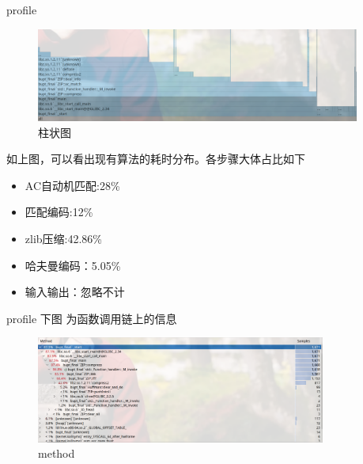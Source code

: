 \documentclass[10pt]{ctexbeamer}
\begin{document}
\begin{frame}{profile}
\begin{figure}[!h]
  \centering
  \includegraphics[width=0.95\textwidth]{./figures/flamegraph.png}
  \caption{柱状图}
\end{figure}

如上图，可以看出现有算法的耗时分布。各步骤大体占比如下
\begin{itemize}
  \item AC自动机匹配:28\%
  \item 匹配编码:12\%
  \item zlib压缩:42.86\%
  \item 哈夫曼编码：5.05\%
  \item 输入输出：忽略不计
\end{itemize}

\end{frame}

\begin{frame}{profile}
  下图 为函数调用链上的信息
\begin{figure}[!h]
  \centering
  \includegraphics[width=0.85\textwidth]{./figures/p5_2.png}
  \caption{method}
\end{figure}
\end{frame}
\end{document}
